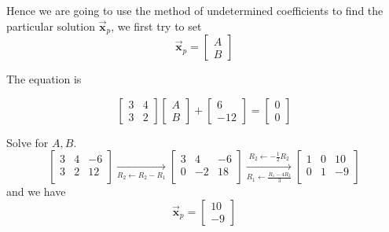 \begin{solution}
    Hence we are going to use the method of undetermined coefficients to find the particular solution 
    $\overrightarrow{\mathbf{x}}_p$, we first try to set 
    \begin{equation*}
        \overrightarrow{\mathbf{x}}_p = \begin{bmatrix}
            A \\ B
        \end{bmatrix}
    \end{equation*}

    The equation is 

    \[
        \begin{bmatrix}
            3 & 4\\ 3 & 2
        \end{bmatrix}
        \begin{bmatrix}
            A \\ B
        \end{bmatrix}
        + \begin{bmatrix}
            6 \\ -12
        \end{bmatrix} = \begin{bmatrix}
            0 \\ 0
        \end{bmatrix}
    \]
    
    Solve for $A, B$.
    \[
        \left[
        \begin{array}{cc|c}
        3 & 4 & -6 \\
        3 & 2 & 12 \\
        \end{array}
        \right] \xrightarrow[R_2 \leftarrow R_2 - R_1]{}
        \left[
        \begin{array}{cc|c}
        3 & 4 & -6 \\
        0 & -2 & 18 \\
        \end{array}
        \right] \xrightarrow[\displaystyle R_1 \leftarrow \frac{R_1 - 4R_2}{3}]{\displaystyle R_2 \leftarrow -\frac{1}{2}R_2}
        \left[
        \begin{array}{cc|c}
            1 & 0 & 10 \\
            0 & 1 & -9 \\
        \end{array}
        \right]
    \]
    and we have 
    \begin{equation*}
        \overrightarrow{\mathbf{x}}_p = \begin{bmatrix}
            10 \\ -9
        \end{bmatrix}
    \end{equation*}


\end{solution}
